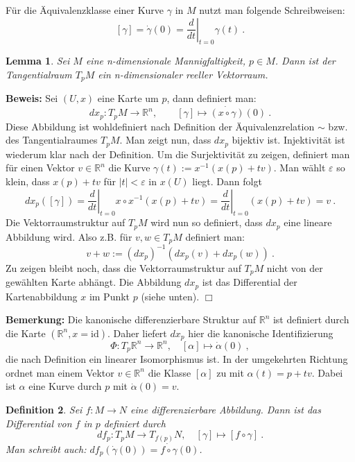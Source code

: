 \documentclass[12pt,a4paper]{article}
\def\R{\mathbb{R}}
\def\id{\mathrm{id}}
\newtheorem{Lemma}{Lemma}[section]
\newtheorem{Definition}[Lemma]{Definition}
\def\proof{\noindent\textbf{Beweis:}\quad}
\def\qed{\quad\hfill\ensuremath{\Box}}
\begin{document}
F\"ur die \"Aquivalenzklasse einer Kurve $\gamma$ in $M$ nutzt man folgende Schreibweisen:
$$
[\gamma] = \dot\gamma(0)= \left.\frac{d}{dt}\right|_{t=0} \gamma(t)\ .
$$

\bigskip

\begin{Lemma}
Sei $M$ eine n-dimensionale Mannigfaltigkeit, $p\in M$. Dann ist der Tangentialraum $T_pM$ ein n-dimensionaler
reeller Vektorraum.
\end{Lemma}
\proof
Sei $(U,x)$ eine Karte um $p$, dann definiert man:
$$
dx_p : T_pM \rightarrow \R^n,\qquad [\gamma] \mapsto \dot{(x\circ \gamma)}(0) \ .
$$
Diese Abbildung ist wohldefiniert nach Definition der \"Aquivalenzrelation $\sim$ bzw. des
Tangentialraumes $T_pM$. Man zeigt nun, dass $dx_p$ bijektiv ist. Injektivit\"at ist wiederum klar
nach der Definition. Um die Surjektivit\"at zu zeigen, definiert man f\"ur einen Vektor $v\in \R^n$
die Kurve $\gamma(t):= x^{-1}(x(p)+tv)$. Man w\"ahlt $\varepsilon$ so klein, dass $x(p)+tv$ f\"ur $|t|<\varepsilon
$ in $x(U)$ liegt. Dann folgt
$$
dx_p ([\gamma]) = \left.\frac{d}{dt}\right|_{t=0} x \circ x^{-1}(x(p)+tv) = \left.\frac{d}{dt}\right|_{t=0}
(x(p)+tv) = v \ .
$$
Die Vektorraumstruktur auf $T_pM$ wird nun so definiert, dass $dx_p$ eine lineare Abbildung wird. Also z.B.
f\"ur $v, w \in T_pM$ definiert man:
$$
v + w := (dx_p)^{-1}(dx_p(v) + dx_p(w)) \ .
$$
Zu zeigen bleibt noch, dass die Vektorraumstruktur auf $T_pM$ nicht von der gew\"ahlten Karte abh\"angt. Die Abbildung
$dx_p$ ist das Differential der Kartenabbildung $x$ im Punkt $p$ (siehe unten).
\qed

\medskip

{\bf Bemerkung:}
Die kanonische differenzierbare Struktur auf $\R^n$ ist definiert durch die Karte $(\R^n,x=\id)$. Daher liefert
$dx_p$ hier die kanonische Identifizierung
$$
\Phi : T_p\R^n \rightarrow \R^n, \quad [\alpha]\mapsto \dot \alpha(0) \ ,
$$
die nach Definition ein linearer Isomorphismus ist.
In der umgekehrten Richtung ordnet man einem Vektor $v\in \R^n$ die Klasse $[\alpha]$ zu mit
$\alpha(t) = p+tv$. Dabei ist $\alpha$ eine Kurve durch $p$ mit $\dot\alpha(0)=v$.


\medskip


\begin{Definition}
Sei $f:M\rightarrow N$ eine differenzierbare Abbildung. Dann ist das {\em Differential} von $f$ in $p$ definiert
durch
$$
df_p : T_pM \rightarrow T_{f(p)}N, \quad [\gamma]\mapsto [f\circ \gamma]  \ .
$$
Man schreibt auch: $df_p (\dot\gamma(0)) = \dot{f\circ \gamma}(0)$.
\end{Definition}
\end{document}
